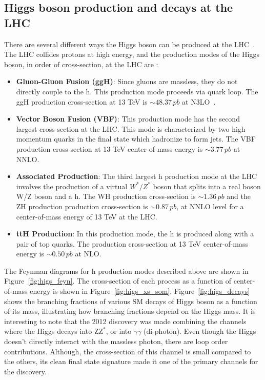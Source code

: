 \subsection{Higgs boson production and decays at the LHC}
There are several different ways the Higgs boson can be produced at the LHC~\cite{th_cec}. The LHC collides protons at high energy, and the production modes of the Higgs boson, in order of cross-section, at the LHC are :

\begin{itemize}
\item \textbf{Gluon-Gluon Fusion (ggH)}: Since gluons are massless, they do not directly couple to the h. This production mode proceeds via quark loop. The ggH production cross-section at 13 TeV is $\sim48.37\,pb$ at N3LO~\cite{YR4}. 
\item \textbf {Vector Boson Fusion (VBF)}: This production mode has the second largest cross section at the LHC. This mode is characterized by two high-momentum quarks in the final state which hadronize to form jets. The VBF production cross-section at 13 TeV center-of-mass energy is $\sim3.77\,pb$ at NNLO.
\item \textbf {Associated Production}: The third largest h production mode at the LHC involves the production of a virtual $W^*/Z^*$ boson that splits into a real boson W/Z boson and a h. The WH production cross-section is  $\sim1.36\,pb$ and the ZH production production cross-section is $\sim0.87\,pb$, at NNLO level for a center-of-mass energy of 13 TeV at the LHC.
\item \textbf {ttH Production}:   In this production mode, the h is produced along with a pair of top quarks. The production cross-section at 13 TeV center-of-mass energy is $\sim0.50\,pb$ at NLO.
\end{itemize}
  
The Feynman diagrams for h production modes described above are shown in Figure~\ref{fig:higs_feyn}. The cross-section of each process as a function of center-of-mass energy is shown in Figure~\ref{fig:higs_xs_som}. Figure~\ref{fig:higs_decays} shows the branching fractions of various SM decays of Higgs boson as a function of its mass, illustrating how branching fractions depend on the Higgs mass. It is interesting to note that the 2012 discovery was made combining the channels where the Higgs decays into Z$\mathrm{Z}^*$, or into $\gamma\gamma$ (di-photon). Even though the Higgs doesn't directly interact with the massless photon, there are loop order contributions. Although, the cross-section of this channel is small compared to the others, its clean final state signature made it one of the primary channels for the discovery.    


